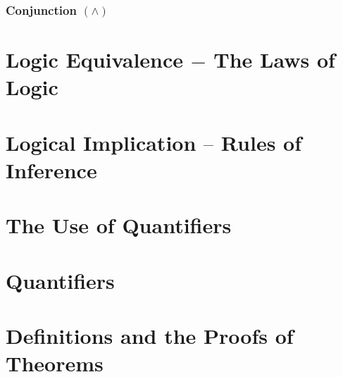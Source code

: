\documentclass{article}
\begin{document}
	\subsubsection{Conjunction $(\land)$}
	\section{Logic Equivalence $-$ The Laws of Logic}

	\section{Logical Implication $–$ Rules of Inference}

	\section{The Use of Quantifiers}
	\section{Quantifiers}
	\section{Definitions and the Proofs of Theorems}
\end{document}
